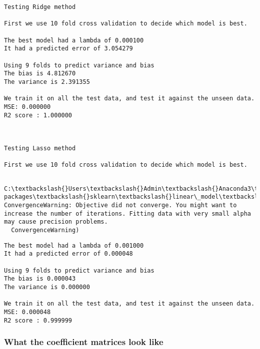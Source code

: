 \documentclass[11pt]{article}
\begin{document}
    \begin{Verbatim}[commandchars=\\\{\}]
Testing Ridge method

First we use 10 fold cross validation to decide which model is best.

The best model had a lambda of 0.000100 
It had a predicted error of 3.054279

Using 9 folds to predict variance and bias
The bias is 4.812670
The variance is 2.391355

We train it on all the test data, and test it against the unseen data.
MSE: 0.000000
R2 score : 1.000000



Testing Lasso method

First we use 10 fold cross validation to decide which model is best.


    \end{Verbatim}

    \begin{Verbatim}[commandchars=\\\{\}]
C:\textbackslash{}Users\textbackslash{}Admin\textbackslash{}Anaconda3\textbackslash{}lib\textbackslash{}site-packages\textbackslash{}sklearn\textbackslash{}linear\_model\textbackslash{}coordinate\_descent.py:491: ConvergenceWarning: Objective did not converge. You might want to increase the number of iterations. Fitting data with very small alpha may cause precision problems.
  ConvergenceWarning)

    \end{Verbatim}

    \begin{Verbatim}[commandchars=\\\{\}]
The best model had a lambda of 0.001000 
It had a predicted error of 0.000048

Using 9 folds to predict variance and bias
The bias is 0.000043
The variance is 0.000000

We train it on all the test data, and test it against the unseen data.
MSE: 0.000048
R2 score : 0.999999

    \end{Verbatim}

    \subsubsection{What the coefficient matrices look
like}\label{what-the-coefficient-matrices-look-like}
\end{document}
